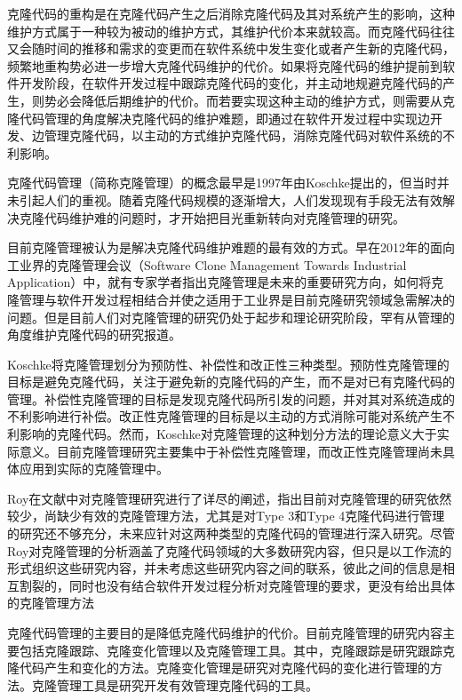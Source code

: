 
克隆代码的重构是在克隆代码产生之后消除克隆代码及其对系统产生的影响，这种维护方式属于一种较为被动的维护方式，其维护代价本来就较高。而克隆代码往往又会随时间的推移和需求的变更而在软件系统中发生变化或者产生新的克隆代码，频繁地重构势必进一步增大克隆代码维护的代价。如果将克隆代码的维护提前到软件开发阶段，在软件开发过程中跟踪克隆代码的变化，并主动地规避克隆代码的产生，则势必会降低后期维护的代价。而若要实现这种主动的维护方式，则需要从克隆代码管理的角度解决克隆代码的维护难题，即通过在软件开发过程中实现边开发、边管理克隆代码，以主动的方式维护克隆代码，消除克隆代码对软件系统的不利影响。

克隆代码管理（简称克隆管理）的概念最早是1997年由Koschke提出的\cite{koschke2008frontiers}，但当时并未引起人们的重视。随着克隆代码规模的逐渐增大，人们发现现有手段无法有效解决克隆代码维护难的问题时，才开始把目光重新转向对克隆管理的研究。

目前克隆管理被认为是解决克隆代码维护难题的最有效的方式。早在2012年的面向工业界的克隆管理会议（Software Clone Management Towards Industrial Application）中，就有专家学者指出克隆管理是未来的重要研究方向，如何将克隆管理与软件开发过程相结合并使之适用于工业界是目前克隆研究领域急需解决的问题\cite{koschke2012software}。但是目前人们对克隆管理的研究仍处于起步和理论研究阶段，罕有从管理的角度维护克隆代码的研究报道。

Koschke将克隆管理划分为预防性、补偿性和改正性三种类型\cite{koschke2008frontiers}。预防性克隆管理的目标是避免克隆代码，关注于避免新的克隆代码的产生，而不是对已有克隆代码的管理。补偿性克隆管理的目标是发现克隆代码所引发的问题，并对其对系统造成的不利影响进行补偿。改正性克隆管理的目标是以主动的方式消除可能对系统产生不利影响的克隆代码。然而，Koschke对克隆管理的这种划分方法的理论意义大于实际意义。目前克隆管理研究主要集中于补偿性克隆管理，而改正性克隆管理尚未具体应用到实际的克隆管理中。

Roy在文献\cite{roy2014vision}中对克隆管理研究进行了详尽的阐述，指出目前对克隆管理的研究依然较少，尚缺少有效的克隆管理方法，尤其是对Type 3和Type 4克隆代码进行管理的研究还不够充分，未来应针对这两种类型的克隆代码的管理进行深入研究。尽管Roy对克隆管理的分析涵盖了克隆代码领域的大多数研究内容，但只是以工作流的形式组织这些研究内容，并未考虑这些研究内容之间的联系，彼此之间的信息是相互割裂的，同时也没有结合软件开发过程分析对克隆管理的要求，更没有给出具体的克隆管理方法

克隆代码管理的主要目的是降低克隆代码维护的代价。目前克隆管理的研究内容主要包括克隆跟踪、克隆变化管理以及克隆管理工具。其中，克隆跟踪是研究跟踪克隆代码产生和变化的方法。克隆变化管理是研究对克隆代码的变化进行管理的方法。克隆管理工具是研究开发有效管理克隆代码的工具。

